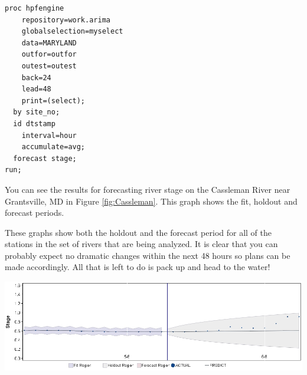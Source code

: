 \documentclass[10pt]{sugconf-ish}
\begin{document}
\small
\begin{verbatim}
proc hpfengine 
    repository=work.arima
    globalselection=myselect
    data=MARYLAND
    outfor=outfor
    outest=outest 
    back=24
    lead=48
    print=(select);
  by site_no;
  id dtstamp 
    interval=hour 
    accumulate=avg;
  forecast stage;
run;
\end{verbatim}
\normalsize

You can see the results for forecasting river stage on the Cassleman River near Grantsville, MD in Figure \ref{fig:Cassleman}. This graph shows the fit, holdout and forecast periods.

These graphs show both the holdout and the forecast period for all of the stations in the set of rivers that are being analyzed. It is clear that you can probably expect no dramatic changes within the next 48 hours so plans can be made accordingly. All that is left to do is pack up and head to the water! 

\begin{minipage}{\linewidth} 
\centering
\includegraphics[width=6in,keepaspectratio]{cassleman.jpg} 
\label{fig:Cassleman}
\end{minipage}
\end{document}
